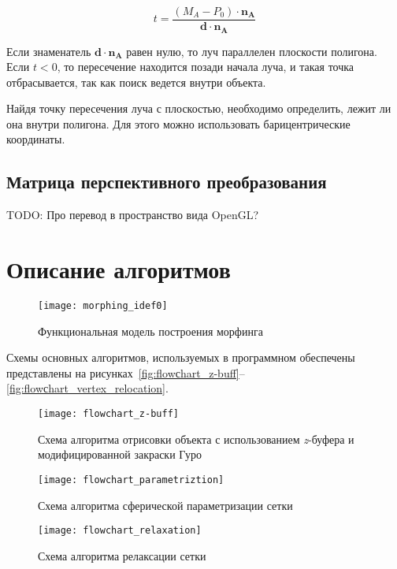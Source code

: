 \begin{equation}
    \label{eq:t-intersect}
    t = \frac{(M_A - P_0) \cdot \mathbf{n_A}}{\mathbf{d} \cdot \mathbf{n_A}}
\end{equation}

Если знаменатель $\mathbf{d} \cdot \mathbf{n_A}$ равен нулю, то луч параллелен плоскости полигона. Если $t < 0$, то пересечение находится позади начала луча, и такая точка отбрасывается, так как поиск ведется внутри объекта.

Найдя точку пересечения луча с плоскостью, необходимо определить, лежит ли она внутри полигона. Для этого можно использовать барицентрические координаты.

\subsection{Матрица перспективного преобразования}
TODO: Про перевод в пространство вида OpenGL?

\section{Описание алгоритмов}

\begin{figure}[H]
    \label{fig:morphig_idef0}
    \texttt{[image: morphing\_idef0]}
    \caption{Функциональная модель построения морфинга}
\end{figure}

Схемы основных алгоритмов, используемых в программном обеспечены представлены на рисунках~\ref{fig:flowсhart_z-buff}--\ref{fig:flowсhart_vertex_relocation}.

\begin{figure}[H]
    \label{fig:flowchart_z-buff}
    \texttt{[image: flowchart\_z-buff]}
    \caption{Схема алгоритма отрисовки объекта с использованием \textit{z}-буфера и модифицированной закраски Гуро}
\end{figure}

\begin{figure}[H]
    \label{fig:flowchart_parametrization}
    \texttt{[image: flowchart\_parametriztion]}
    \caption{Схема алгоритма сферической параметризации сетки}
\end{figure}

\begin{figure}[H]
    \label{fig:flowchart_relaxation}
    \texttt{[image: flowchart\_relaxation]}
    \caption{Схема алгоритма релаксации сетки}
\end{figure}

